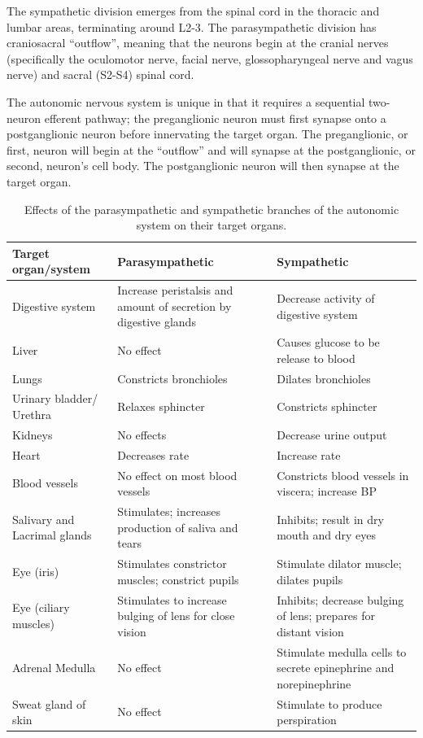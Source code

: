 \documentclass[]{book}
\begin{document}
The sympathetic division emerges from the spinal cord in the thoracic and lumbar areas, terminating around L2-3. The parasympathetic division has craniosacral ``outflow'', meaning that the neurons begin at the cranial nerves (specifically the oculomotor nerve, facial nerve, glossopharyngeal nerve and vagus nerve) and sacral (S2-S4) spinal cord.

The autonomic nervous system is unique in that it requires a sequential two-neuron efferent pathway; the preganglionic neuron must first synapse onto a postganglionic neuron before innervating the target organ. The preganglionic, or first, neuron will begin at the ``outflow'' and will synapse at the postganglionic, or second, neuron's cell body. The postganglionic neuron will then synapse at the target organ.

\begin{longtable}[t]{>{\raggedright\arraybackslash}p{10em}>{\raggedright\arraybackslash}p{10em}>{\raggedright\arraybackslash}p{15em}}
\caption{\label{tab:autonomic}Effects of the parasympathetic and sympathetic branches of the autonomic system on their target organs.}\\
\toprule
Target organ/system & Parasympathetic & Sympathetic\\
\midrule
\rowcolor{gray!6}  Digestive system & Increase peristalsis and amount of secretion by digestive glands & Decrease activity of digestive system\\
Liver & No effect & Causes glucose to be release to blood\\
\rowcolor{gray!6}  Lungs & Constricts bronchioles & Dilates bronchioles\\
Urinary bladder/ Urethra & Relaxes sphincter & Constricts sphincter\\
\rowcolor{gray!6}  Kidneys & No effects & Decrease urine output\\
\addlinespace
Heart & Decreases rate & Increase rate\\
\rowcolor{gray!6}  Blood vessels & No effect on most blood vessels & Constricts blood vessels in viscera; increase BP\\
Salivary and Lacrimal glands & Stimulates; increases production of saliva and tears & Inhibits; result in dry mouth and dry eyes\\
\rowcolor{gray!6}  Eye (iris) & Stimulates constrictor muscles; constrict pupils & Stimulate dilator muscle; dilates pupils\\
Eye (ciliary muscles) & Stimulates to increase bulging of lens for close vision & Inhibits; decrease bulging of lens; prepares for distant vision\\
\addlinespace
\rowcolor{gray!6}  Adrenal Medulla & No effect & Stimulate medulla cells to secrete epinephrine and norepinephrine\\
Sweat gland of skin & No effect & Stimulate to produce perspiration\\
\bottomrule
\end{longtable}
\end{document}
